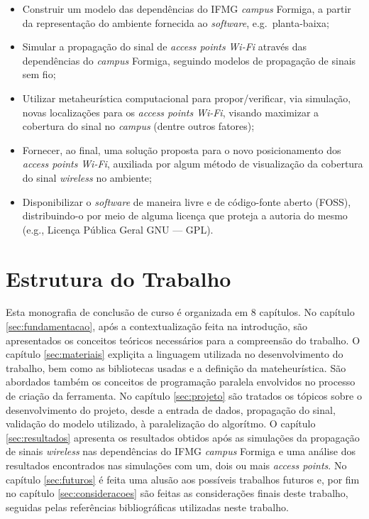 \documentclass[
	12pt,				%
	twoside,			%
	a4paper,			%
	english,			%
	french,				%
	spanish,			%
	brazil				%
	]{abntex2}
\begin{document}
\begin{itemize}
\item
  Construir um modelo das dependências do IFMG \emph{campus} Formiga, a
  partir da representação do ambiente fornecida ao \emph{software},
  e.g.~planta-baixa;
\item
  Simular a propagação do sinal de \emph{access points} \emph{Wi-Fi}
  através das dependências do \emph{campus} Formiga, seguindo modelos de
  propagação de sinais sem fio;
\item
  Utilizar metaheurística computacional para propor/verificar, via
  simulação, novas localizações para os \emph{access points}
  \emph{Wi-Fi}, visando maximizar a cobertura do sinal no \emph{campus}
  (dentre outros fatores);
\item
  Fornecer, ao final, uma solução proposta para o novo posicionamento
  dos \emph{access points} \emph{Wi-Fi}, auxiliada por algum método de
  visualização da cobertura do sinal \emph{wireless} no ambiente;
\item
  Disponibilizar o \emph{software} de maneira livre e de código-fonte
  aberto (FOSS), distribuindo-o por meio de alguma licença que proteja a
  autoria do mesmo (e.g., Licença Pública Geral GNU --- GPL).
\end{itemize}

\section{Estrutura do Trabalho}\label{estrutura-do-trabalho}

Esta monografia de conclusão de curso é organizada em 8 capítulos. No
capítulo \ref{sec:fundamentacao}, após a contextualização feita na
introdução, são apresentados os conceitos teóricos necessários para a
compreensão do trabalho. O capítulo \ref{sec:materiais} expliçita a
linguagem utilizada no desenvolvimento do trabalho, bem como as
bibliotecas usadas e a definição da mateheurística. São abordados também
os conceitos de programação paralela envolvidos no processo de criação
da ferramenta. No capítulo \ref{sec:projeto} são tratados os tópicos
sobre o desenvolvimento do projeto, desde a entrada de dados, propagação
do sinal, validação do modelo utilizado, à paralelização do algorítmo. O
capítulo \ref{sec:resultados} apresenta os resultados obtidos após as
simulações da propagação de sinais \emph{wireless} nas dependências do
IFMG \emph{campus} Formiga e uma análise dos resultados encontrados nas
simulações com um, dois ou mais \emph{access points}. No capítulo
\ref{sec:futuros} é feita uma alusão aos possíveis trabalhos futuros e,
por fim no capítulo \ref{sec:consideracoes} são feitas as considerações
finais deste trabalho, seguidas pelas referências bibliográficas
utilizadas neste trabalho.
\end{document}
